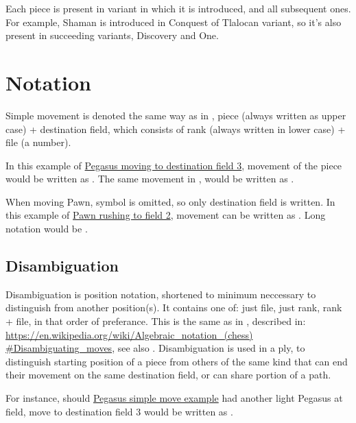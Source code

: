 Each piece is present in variant in which it is introduced, and all subsequent ones.
For example, Shaman is introduced in Conquest of Tlalocan variant, so it's also present
in succeeding variants, Discovery and One.

\clearpage %

\section*{Notation}
\label{sec:Appendix/Notation}

Simple movement is denoted the same way as in , piece (always written as upper
case) + destination field, which consists of rank (always written in lower case) + file
(a number).

In this example of \hyperref[fig:scn_ct_03_define_step_ply]{Pegasus moving to destination
field 3}, movement of the piece would be written as . The same movement in
, would be written as .

When moving Pawn, symbol is omitted, so only destination field is written. In this example
of \hyperref[fig:04_croatian_ties_en_passant]{Pawn rushing to field 2}, movement can be
written as . Long notation would be .

\subsection*{Disambiguation}
\label{sec:Appendix/Notation/Disambiguation}

Disambiguation is position notation, shortened to minimum neccessary to distinguish from
another position(s). It contains one of: just file, just rank, rank + file, in that order
of preferance. This is the same as in , described in: \newline
\href{https://en.wikipedia.org/wiki/Algebraic\_notation\_(chess)\#Disambiguating\_moves}{https://en.wikipedia.org/wiki/Algebraic\_notation\_(chess)\newline
\#Disambiguating\_moves}, see also .
Disambiguation is used in a ply, to distinguish starting position of a piece from others
of the same kind that can end their movement on the same destination field, or can share
portion of a path.

For instance, should \hyperref[fig:scn_ct_03_define_step_ply]{Pegasus simple move example}
had another light Pegasus at  field, move to destination field 3 would be written
as .

